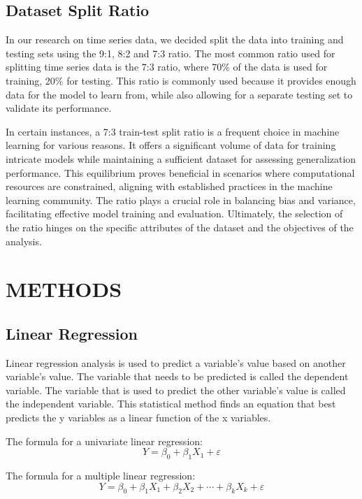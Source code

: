 \documentclass{ieeeojies}
\begin{document}
\subsection{Dataset Split Ratio}
\hspace{0.3cm}\hspace{0.3cm}In our research on time series data, we decided split the data into training and testing sets using the 9:1, 8:2 and 7:3 ratio. The most common ratio used for splitting time series data is the 7:3 ratio, where 70\% of the data is used for training, 20\% for testing. This ratio is
commonly used because it provides enough data for the model to learn from, while also allowing for a separate testing set to validate its performance. 

In certain instances, a 7:3 train-test split ratio is a frequent choice in machine learning for various reasons. It offers a significant volume of data for training intricate models while maintaining a sufficient dataset for assessing generalization performance. This equilibrium proves beneficial in scenarios where computational resources are constrained, aligning with established practices in the machine learning community. The ratio plays a crucial role in balancing bias and variance, facilitating effective model training and evaluation. Ultimately, the selection of the ratio hinges on the specific attributes of the dataset and the objectives of the analysis.

\section{\centering METHODS}
\subsection{Linear Regression}
\hspace{0.3cm}Linear regression analysis is used to predict a variable's value based on another variable's value. The variable that needs to be predicted is called the dependent variable. The variable that is used to predict the other variable’s value is called the independent variable. This statistical method finds an equation that best predicts the y variables as a linear function of the x variables\cite{ibmAboutLinear}. 

The formula for a univariate linear regression\cite{corporatefinanceinstituteMultipleLinear}:
$$
Y=\beta_0+\beta_1 X_1+\varepsilon
$$

The formula for a multiple linear regression:
$$
Y=\beta_0+\beta_1 X_1+\beta_2 X_2+\cdots+\beta_k X_k+\varepsilon
$$
\end{document}
